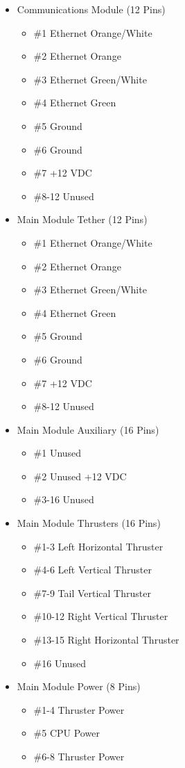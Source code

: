 \documentclass[
18pt, %
a4paper, %
oneside, %
headinclude,footinclude, %
]{scrartcl}
\begin{document}
\begin{itemize}[noitemsep] %
	\item Communications Module (12 Pins)
	\begin{itemize}[noitemsep]
		\item \#1 Ethernet Orange/White
		\item \#2 Ethernet Orange
		\item \#3 Ethernet Green/White
		\item \#4 Ethernet Green
		\item \#5 Ground
		\item \#6 Ground
		\item \#7 +12 VDC
		\item \#8-12 Unused
	\end{itemize}
	\item Main Module Tether (12 Pins)
		\begin{itemize}[noitemsep]
		\item \#1 Ethernet Orange/White
		\item \#2 Ethernet Orange
		\item \#3 Ethernet Green/White
		\item \#4 Ethernet Green
		\item \#5 Ground
		\item \#6 Ground
		\item \#7 +12 VDC
		\item \#8-12 Unused
	\end{itemize}
	\item Main Module Auxiliary (16 Pins)
		\begin{itemize}[noitemsep]
		\item \#1 Unused
		\item \#2 Unused +12 VDC
		\item \#3-16 Unused
	\end{itemize}
	\item Main Module Thrusters (16 Pins)
		\begin{itemize}[noitemsep]
		\item \#1-3 Left Horizontal Thruster
		\item \#4-6 Left Vertical Thruster
		\item \#7-9 Tail Vertical Thruster
		\item \#10-12 Right Vertical Thruster
		\item \#13-15 Right Horizontal Thruster
		\item \#16 Unused
	\end{itemize}
	\item Main Module Power (8 Pins)
		\begin{itemize}[noitemsep]
		\item \#1-4 Thruster Power
		\item \#5 CPU Power
		\item \#6-8 Thruster Power


\end{itemize}
\end{itemize}
\end{document}
